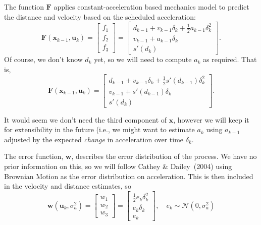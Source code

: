 \documentclass[11pt]{article}\usepackage[]{graphicx}\usepackage[]{color}
\newcommand{\bx}{\boldsymbol{x}}
\newcommand{\bu}{\boldsymbol{u}}
\newcommand{\bw}{\boldsymbol{w}}
\newcommand{\bF}{\boldsymbol{F}}
\begin{document}
The function $\bF$ applies constant-acceleration based mechanics model to predict the distance and
velocity based on the scheduled acceleration:
\begin{equation}
  \label{eq:state-function-acc}
  \bF\left(\bx_{k-1}, \bu_k\right) =
  \begin{bmatrix}
    f_1 \\ f_2 \\ f_3
  \end{bmatrix} =
  \begin{bmatrix}
    d_{k-1} + v_{k-1} \delta_k + \frac{1}{2} a_{k-1} \delta_k^2 \\
    v_{k-1} + a_{k-1} \delta_k \\
    s'\left(d_{k}\right)
  \end{bmatrix}.
\end{equation}
Of course, we don't know $d_k$ yet, so we will need to compute $a_k$ as required. That is,
\begin{equation*}
  \bF\left(\bx_{k-1}, \bu_k\right) =
  \begin{bmatrix}
    d_{k-1} + v_{k-1} \delta_k + \frac{1}{2} s'\left(d_{k-1}\right) \delta_k^2 \\
    v_{k-1} + s'\left(d_{k-1}\right) \delta_k \\
    s'\left(d_{k}\right)
  \end{bmatrix}.
\end{equation*}

It would seem we don't need the third component of $\bx$, however we will keep it for extensibility
in the future (i.e., we might want to estimate $a_k$ using $a_{k-1}$ adjusted by the expected
\emph{change} in acceleration over time $\delta_k$.

The error function, $\bw$, describes the error distribution of the process.
We have no prior information on this, so we will follow Cathey \& Dailey~(2004) using
Brownian Motion as the error distribution on acceleration. This is then included in the velocity and
distance estimates, so
\begin{equation}
  \label{eq:error-function-acc}
  \bw\left(\bu_k, \sigma_a^2\right) =
  \begin{bmatrix}
    w_1 \\ w_2 \\ w_3
  \end{bmatrix} =
  \begin{bmatrix}
    \frac{1}{2} e_k \delta_k^2 \\
    e_k \delta_k \\
    e_k
  \end{bmatrix}, \quad
  e_k \sim \mathcal{N}\left(0, \sigma_a^2\right)
\end{equation}
\end{document}
